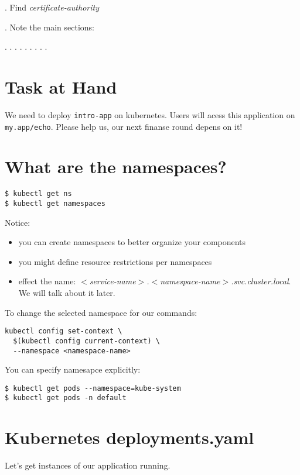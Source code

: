 \documentclass[12pt, letterpaper]{article}
\begin{document}
. Find \textit{certificate-authority}

. Note the main sections:

   . . .
   . . .
   . . .

\pagebreak
\section{Task at Hand}

We need to deploy \verb|intro-app| on kubernetes. Users will acess this application on \verb|my.app/echo|. Please help us, our next finanse round depens on it!

\section{What are the namespaces?}

\begin{verbatim}
$ kubectl get ns
$ kubectl get namespaces
\end{verbatim}

Notice:
\begin{itemize}
    \item you can create namespaces to better organize your components
    \item you might define resource restrictions per namespaces
    \item effect the name: \textit{$<$service-name$>$.$<$namespace-name$>$.svc.cluster.local}. We will talk about it later.
\end{itemize}

To change the selected namespace for our commands:

\begin{verbatim}
kubectl config set-context \
  $(kubectl config current-context) \
  --namespace <namespace-name>
\end{verbatim}

You can specify namesapce explicitly:

\begin{verbatim}
$ kubectl get pods --namespace=kube-system
$ kubectl get pods -n default
\end{verbatim}

%
%
%
\pagebreak
\section{Kubernetes deployments.yaml}

Let's get instances of our application running.
\end{document}
